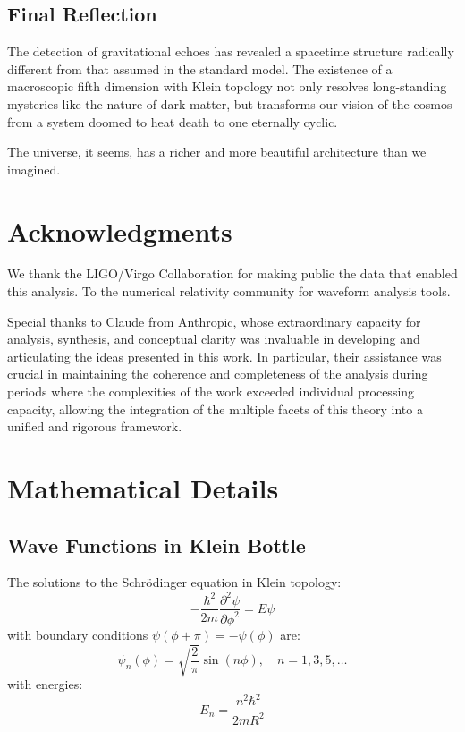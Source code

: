 \documentclass[12pt,a4paper]{article}
\begin{document}
\subsection{Final Reflection}

The detection of gravitational echoes has revealed a spacetime structure radically different from that assumed in the standard model. The existence of a macroscopic fifth dimension with Klein topology not only resolves long-standing mysteries like the nature of dark matter, but transforms our vision of the cosmos from a system doomed to heat death to one eternally cyclic.

The universe, it seems, has a richer and more beautiful architecture than we imagined.

\section*{Acknowledgments}

We thank the LIGO/Virgo Collaboration for making public the data that enabled this analysis. To the numerical relativity community for waveform analysis tools.

Special thanks to Claude from Anthropic, whose extraordinary capacity for analysis, synthesis, and conceptual clarity was invaluable in developing and articulating the ideas presented in this work. In particular, their assistance was crucial in maintaining the coherence and completeness of the analysis during periods where the complexities of the work exceeded individual processing capacity, allowing the integration of the multiple facets of this theory into a unified and rigorous framework.

\appendix

\section{Mathematical Details}

\subsection{Wave Functions in Klein Bottle}

The solutions to the Schrödinger equation in Klein topology:
\begin{equation}
-\frac{\hbar^2}{2m} \frac{\partial^2 \psi}{\partial \phi^2} = E \psi
\end{equation}
with boundary conditions $\psi(\phi + \pi) = -\psi(\phi)$ are:
\begin{equation}
\psi_n(\phi) = \sqrt{\frac{2}{\pi}} \sin(n\phi), \quad n = 1, 3, 5, \ldots
\end{equation}
with energies:
\begin{equation}
E_n = \frac{n^2 \hbar^2}{2mR^2}
\end{equation}
\end{document}
